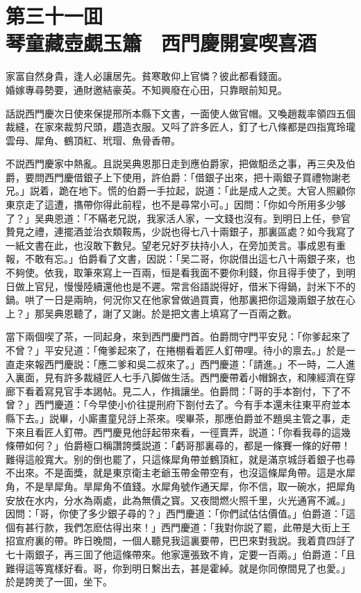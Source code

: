 
\chapter*{第三十一囬　\\琴童藏壺覷玉簫　西門慶開宴喫喜酒}
\thispagestyle{empty}

\begin{myquote}
家富自然身貴，逢人必讓居先。貧寒敢仰上官憐？彼此都看錢面。\\
婚嫁專尋勢要，通財邀結豪英。不知興廢在心田，只靠眼前知見。
\end{myquote}

話説西門慶次日使來保提邢所本縣下文書，一面使人做官帽。又喚趙裁率領四五個裁縫，在家來裁剪尺頭，趲造衣服。又呌了許多匠人，釘了七八條都是四指寬玲瓏雲母、犀角、鶴頂紅、玳瑁、魚骨香帶。

不説西門慶家中熱亂。且説吴典恩那日走到應伯爵家，把做馹丞之事，再三央及伯爵，要問西門慶借銀子上下使用，許伯爵：「借銀子出來，把十兩銀子買禮物謝老兄。」説着，跪在地下。慌的伯爵一手拉起，説道：「此是成人之羙。大官人照顧你東京走了這遭，㩦帶你得此前程，也不是尋常小可。」因問：「你如今所用多少够了？」吴典恩道：「不瞞老兄説，我家活人家，一文錢也沒有。到明日上任，參官贄見之禮，連擺酒並治衣類鞍馬，少説也得七八十兩銀子，那裏區處？如今我寫了一紙文書在此，也沒敢下數兒。望老兄好歹扶持小人，在旁加羙言。事成恩有重報，不敢有忘。」伯爵看了文書，因説：「吴二哥，你説借出這七八十兩銀子來，也不夠使。依我，取筆來寫上一百兩，恒是看我面不要你利錢，你且得手使了，到明日做上官兒，慢慢陸續還他也是不遲。常言俗語説得好，借米下得鍋，討米下不的鍋。哄了一日是兩晌，何況你又在他家曾做過買賣，他那裏把你這幾兩銀子放在心上？」那吴典恩聽了，謝了又謝。於是把文書上填寫了一百兩之數。

當下兩個喫了茶，一同起身，來到西門慶門首。伯爵問守門平安兒：「你爹起來了不曾？」平安兒道：「俺爹起來了，在捲棚看着匠人釘帶哩。待小的禀去。」於是一直走來報西門慶説：「應二爹和吳二叔來了。」西門慶道：「請進。」不一時，二人進入裏面，見有許多裁縫匠人七手八脚做生活。西門慶帶着小帽錦衣，和陳經濟在穿廊下看着寫見官手本謁帖。見二人，作揖讓坐。伯爵問：「哥的手本劄付，下了不曾？」西門慶道：「今早使小价往提刑府下劄付去了。今有手本還未往東平府並本縣下去。」説畢，小廝畫童兒㧱上茶來。喫畢茶，那應伯爵並不題吳主管之事，走下來且看匠人釘帶。西門慶見他㧱起带來看，一徑賣弄，説道：「你看我尋的這幾條帶如何？」伯爵極口稱讚誇獎説道：「虧哥那裏尋的，都是一條賽一條的好帶！難得這般寬大。别的倒也罷了，只這條犀角帶並鶴頂紅，就是滿京城㧱着銀子也尋不出來。不是面獎，就是東京衛主老爺玉帶金帶空有，也沒這條犀角帶。這是水犀角，不是旱犀角。旱犀角不值錢。水犀角號作通天犀，你不信，取一碗水，把犀角安放在水内，分水為兩處，此為無價之寳。又夜間燃火照千里，火光通宵不滅。」因問：「哥，你使了多少銀子尋的？」西門慶道：「你們試估估價值。」伯爵道：「這個有甚行款，我們怎麽估得出來！」西門慶道：「我對你説了罷，此帶是大街上王招宣府裏的帶。昨日晚間，一個人聽見我這裏要帶，巴巴來對我説。我着賁四㧱了七十兩銀子，再三囬了他這條帶來。他家還張致不肯，定要一百兩。」伯爵道：「且難得這等寬樣好看。哥，你到明日繫出去，甚是霍綽。就是你同僚間見了也愛。」於是誇羙了一囬，坐下。

